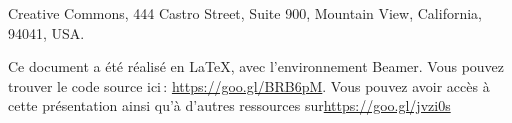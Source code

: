 \par Creative Commons, 444 Castro Street, Suite 900, Mountain View, California, 94041, USA.
\par Ce document a été réalisé en \LaTeX, avec l'environnement Beamer. Vous pouvez trouver le code source ici\,: \url{https://goo.gl/BRB6pM}. Vous pouvez avoir accès à cette présentation ainsi qu'à d'autres ressources sur\url {https://goo.gl/jvzi0s}


